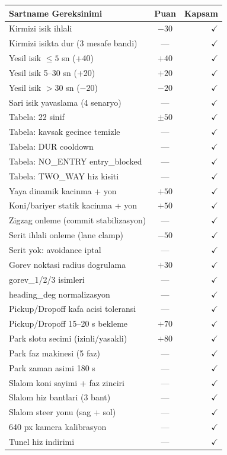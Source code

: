 \documentclass[a4paper,12pt]{article}
\newcommand{\PASS}{\textcolor{green!60!black}{$\checkmark$}}
\begin{document}
\begin{center}
\renewcommand{\arraystretch}{1.2}
\begin{longtable}{p{6.5cm}cr}
  \toprule
  Sartname Gereksinimi                   & Puan  & Kapsam\\
  \midrule
  \endhead
  Kirmizi isik ihlali                    & $-30$ & \PASS\\
  Kirmizi isikta dur (3 mesafe bandi)    & ---   & \PASS\\
  Yesil isik $\leq 5$ sn (+40)          & $+40$ & \PASS\\
  Yesil isik 5--30 sn (+20)             & $+20$ & \PASS\\
  Yesil isik $>30$ sn ($-20$)           & $-20$ & \PASS\\
  Sari isik yavaslama (4 senaryo)        & ---   & \PASS\\
  Tabela: 22 sinif                       & $\pm50$& \PASS\\
  Tabela: kavsak gecince temizle         & ---   & \PASS\\
  Tabela: DUR cooldown                   & ---   & \PASS\\
  Tabela: NO\_ENTRY entry\_blocked       & ---   & \PASS\\
  Tabela: TWO\_WAY hiz kisiti            & ---   & \PASS\\
  Yaya dinamik kacinma + yon             & $+50$ & \PASS\\
  Koni/bariyer statik kacinma + yon      & $+50$ & \PASS\\
  Zigzag onleme (commit stabilizasyon)   & ---   & \PASS\\
  Serit ihlali onleme (lane clamp)       & $-50$ & \PASS\\
  Serit yok: avoidance iptal             & ---   & \PASS\\
  Gorev noktasi radius dogrulama         & $+30$ & \PASS\\
  gorev\_1/2/3 isimleri                  & ---   & \PASS\\
  heading\_deg normalizasyon             & ---   & \PASS\\
  Pickup/Dropoff kafa acisi toleransi    & ---   & \PASS\\
  Pickup/Dropoff 15--20 s bekleme        & $+70$ & \PASS\\
  Park slotu secimi (izinli/yasakli)     & $+80$ & \PASS\\
  Park faz makinesi (5 faz)             & ---   & \PASS\\
  Park zaman asimi 180 s                 & ---   & \PASS\\
  Slalom koni sayimi + faz zinciri       & ---   & \PASS\\
  Slalom hiz bantlari (3 bant)           & ---   & \PASS\\
  Slalom steer yonu (sag + sol)          & ---   & \PASS\\
  640 px kamera kalibrasyon              & ---   & \PASS\\
  Tunel hiz indirimi                     & ---   & \PASS\\
  \bottomrule
\end{longtable}
\end{center}
\end{document}
